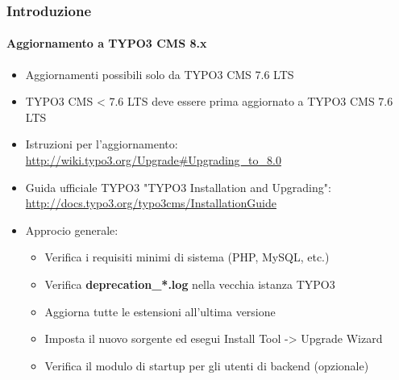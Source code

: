 \begin{frame}[fragile]
	\frametitle{Introduzione}
	\framesubtitle{Aggiornamento a TYPO3 CMS 8.x}

	\begin{itemize}
		\item Aggiornamenti possibili solo da TYPO3 CMS 7.6 LTS
		\item TYPO3 CMS < 7.6 LTS deve essere prima aggiornato a TYPO3 CMS 7.6 LTS
	\end{itemize}

	\begin{itemize}

		\item Istruzioni per l'aggiornamento:\newline
			\smaller\url{http://wiki.typo3.org/Upgrade#Upgrading_to_8.0}\normalsize
		\item Guida ufficiale TYPO3 "TYPO3 Installation and Upgrading":
			\smaller\url{http://docs.typo3.org/typo3cms/InstallationGuide}\normalsize
		\item Approcio generale:
			\begin{itemize}
				\item Verifica i requisiti minimi di sistema \small(PHP, MySQL, etc.)
				\item Verifica \textbf{deprecation\_*.log} nella vecchia istanza TYPO3
				\item Aggiorna tutte le estensioni all'ultima versione
				\item Imposta il nuovo sorgente ed esegui Install Tool -> Upgrade Wizard
				\item Verifica il modulo di startup per gli utenti di backend (opzionale)
			\end{itemize}
	\end{itemize}

\end{frame}


